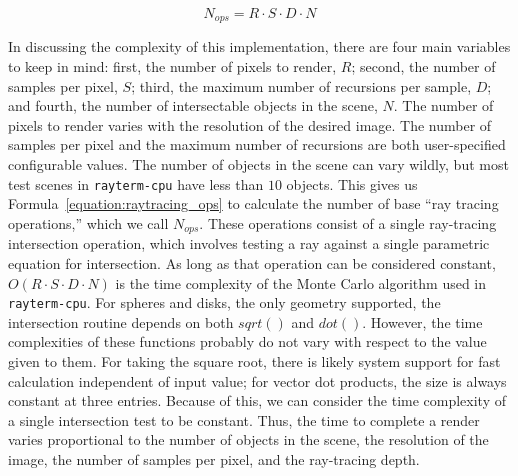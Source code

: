 \begin{equation}
  \label{equation:raytracing_ops}
  N_{ops} = R \cdot S \cdot D \cdot N
\end{equation}

In discussing the complexity of this implementation, there are four main variables to keep in mind: first, the number of pixels to render, $R$; second, the number of samples per pixel, $S$; third, the maximum number of recursions per sample, $D$; and fourth, the number of intersectable objects in the scene, $N$.
The number of pixels to render varies with the resolution of the desired image.
The number of samples per pixel and the maximum number of recursions are both user-specified configurable values.
The number of objects in the scene can vary wildly, but most test scenes in \texttt{rayterm-cpu} have less than $10$ objects.
This gives us Formula~\ref{equation:raytracing_ops} to calculate the number of base ``ray tracing operations,'' which we call $N_{ops}$.
These operations consist of a single ray-tracing intersection operation, which involves testing a ray against a single parametric equation for intersection.
As long as that operation can be considered constant, $O(R \cdot S \cdot D \cdot N)$ is the time complexity of the Monte Carlo algorithm used in \texttt{rayterm-cpu}.
For spheres and disks, the only geometry supported, the intersection routine depends on both $sqrt()$ and $dot()$.
However, the time complexities of these functions probably do not vary with respect to the value given to them.
For taking the square root, there is likely system support for fast calculation independent of input value; for vector dot products, the size is always constant at three entries.
Because of this, we can consider the time complexity of a single intersection test to be constant.
Thus, the time to complete a render varies proportional to the number of objects in the scene, the resolution of the image, the number of samples per pixel, and the ray-tracing depth.

